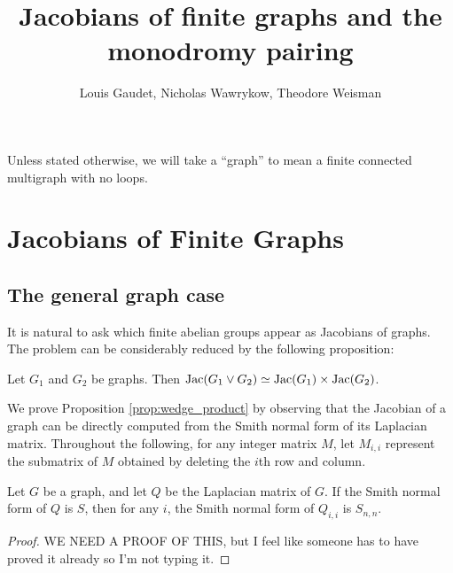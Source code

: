 \documentclass{amsart}
\title{Jacobians of finite graphs and the monodromy pairing}
\author{Louis Gaudet, Nicholas Wawrykow, Theodore Weisman}
\begin{document}
\maketitle

Unless stated otherwise, we will take a ``graph'' to mean a finite
connected multigraph with no loops.

\section{Jacobians of Finite Graphs}
\label{sec:jacobians}

\subsection{The general graph case}
It is natural to ask which finite abelian groups appear as Jacobians
of graphs. The problem can be considerably reduced by the following
proposition:

\begin{prop}
\label{prop:wedge_product}
Let $G_1$ and $G_2$ be graphs. Then $\operatorname{Jac}(G_1 \vee G_2) \simeq
\operatorname{Jac}(G_1) \times \operatorname{Jac}(G_2)$.
\end{prop}

We prove Proposition \ref{prop:wedge_product} by observing that the
Jacobian of a graph can be directly computed from the Smith normal
form of its Laplacian matrix. Throughout the following, for any
integer matrix $M$, let $M_{i,i}$ represent the submatrix of $M$ obtained
by deleting the $i$th row and column.

\begin{lem}
\label{lem:SNF_submatrix}
Let $G$ be a graph, and let $Q$ be the Laplacian matrix of $G$. If the
Smith normal form of $Q$ is $S$, then for any $i$, the Smith normal
form of $Q_{i,i}$ is $S_{n,n}$.
\end{lem}
\begin{proof}
  WE NEED A PROOF OF THIS, but I feel like someone has to have proved
  it already so I'm not typing it.
\end{proof}
\end{document}
